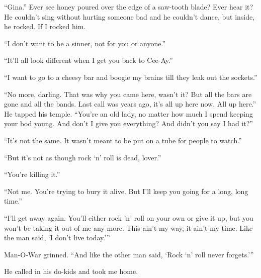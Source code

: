 “Gina.” Ever see honey poured over the edge of a saw-tooth blade? Ever hear it? He couldn't sing without hurting someone bad and he couldn't dance, but inside, he rocked. If I rocked him.

“I don't want to be a sinner, not for you or anyone.”

“It'll all look different when I get you back to Cee-Ay.”

“I want to go to a cheesy bar and boogie my brains till they leak out the sockets.”

“No more, darling. That was why you came here, wasn't it? But all the bars are gone and all the bands. Last call was years ago, it's all up here now. All up here.” He tapped his temple. “You're an old lady, no matter how much I spend keeping your bod young. And don't I give you everything? And didn't you say I had it?”

“It's not the same. It wasn't meant to be put on a tube for people to watch.”

“But it's not as though rock ‘n' roll is dead, lover.”

“You're killing it.”

“Not me. You're trying to bury it alive. But I'll keep you going for a long, long time.”

“I'll get away again. You'll either rock 'n' roll on your own or give it up, but you won't be taking it out of me any more. This ain't my way, it ain't my time. Like the man said, ‘I don't live today.'”

Man-O-War grinned. “And like the other man said, ‘Rock ‘n' roll never forgets.'”

He called in his do-kids and took me home.
